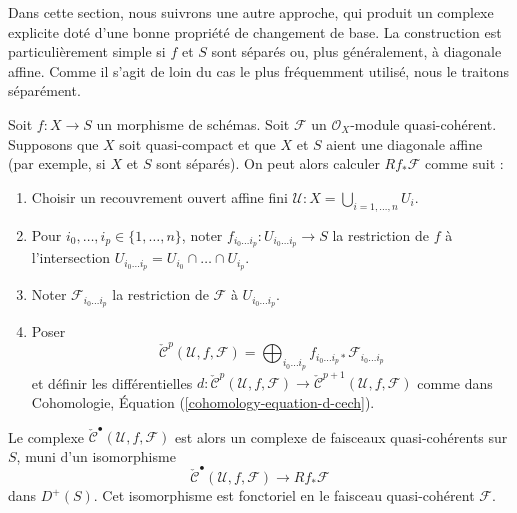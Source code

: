 \medskip\noindent
Dans cette section, nous suivrons une autre approche, qui produit un complexe
explicite doté d'une bonne propriété de changement de base. La construction
est particulièrement simple si $f$ et $S$ sont séparés ou, plus généralement,
à diagonale affine. Comme il s'agit de loin du cas le plus fréquemment utilisé,
nous le traitons séparément.

\begin{lemma}
\label{lemma-separated-case-relative-cech}
Soit $f : X \to S$ un morphisme de schémas. Soit $\mathcal{F}$ un
$\mathcal{O}_X$-module quasi-cohérent. Supposons que $X$ soit quasi-compact et
que $X$ et $S$ aient une diagonale affine (par exemple, si $X$ et $S$ sont
séparés). On peut alors calculer $Rf_*\mathcal{F}$ comme suit :
\begin{enumerate}
\item Choisir un recouvrement ouvert affine fini
$\mathcal{U} : X = \bigcup_{i = 1, \ldots, n} U_i$.
\item Pour $i_0, \ldots, i_p \in \{1, \ldots, n\}$, noter
$f_{i_0 \ldots i_p} : U_{i_0 \ldots i_p} \to S$ la restriction de $f$ à
l'intersection $U_{i_0 \ldots i_p} = U_{i_0} \cap \ldots \cap U_{i_p}$.
\item Noter $\mathcal{F}_{i_0 \ldots i_p}$ la restriction de $\mathcal{F}$ à
$U_{i_0 \ldots i_p}$.
\item Poser
$$
\check{\mathcal{C}}^p(\mathcal{U}, f, \mathcal{F}) =
\bigoplus\nolimits_{i_0 \ldots i_p}
f_{i_0 \ldots i_p *} \mathcal{F}_{i_0 \ldots i_p}
$$
et définir les différentielles
$d : \check{\mathcal{C}}^p(\mathcal{U}, f, \mathcal{F})
\to \check{\mathcal{C}}^{p + 1}(\mathcal{U}, f, \mathcal{F})$
comme dans Cohomologie, Équation (\ref{cohomology-equation-d-cech}).
\end{enumerate}
Le complexe $\check{\mathcal{C}}^\bullet(\mathcal{U}, f, \mathcal{F})$ est
alors un complexe de faisceaux quasi-cohérents sur $S$, muni d'un isomorphisme
$$
\check{\mathcal{C}}^\bullet(\mathcal{U}, f, \mathcal{F})
\longrightarrow
Rf_*\mathcal{F}
$$
dans $D^{+}(S)$. Cet isomorphisme est fonctoriel en le faisceau quasi-cohérent
$\mathcal{F}$.
\end{lemma}

